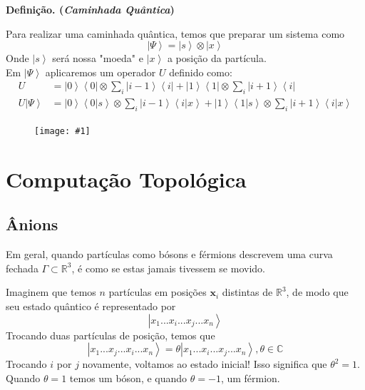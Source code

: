 \documentclass[t]{beamer}
\newcommand{\definicao}[1]{%
	\textbf{Definição. (\emph{#1})\\}
}
\newcommand{\ket}[1]{\ensuremath{\left|#1\right\rangle}}
\newcommand{\braket}[2]{\ensuremath{\left\langle#1|#2\right\rangle}}
\newcommand{\ketbra}[2]{\ensuremath{\left|#1\right\rangle\left\langle#2\right|}}
\newcommand{\imgw}[2]{%
\begin{center}
	\begin{figure}
	\texttt{[image: \#1]}\\
	\end{figure}
\end{center}
}
\begin{document}
	\begin{frame}{\subsecname}
	\definicao{Caminhada Quântica}
	Para realizar uma caminhada quântica, temos que preparar um sistema como
		$$\ket{\Psi} = \ket{s} \otimes \ket{x}$$
	Onde $\ket{s}$ será nossa "moeda" e $\ket{x}$ a posição da partícula.\\
	
	Em $\ket{\Psi}$ aplicaremos um operador $U$ definido como:
	\footnotesize	
	\begin{align*}
		U &= \ketbra{0}{0} \otimes \sum_{i}\ketbra{i-1}{i} + \ketbra{1}{1} \otimes \sum_{i}\ketbra{i+1}{i}\\
		U \ket{\Psi} &= \ket{0}\braket{0}{s} \otimes \sum_{i}\ket{i-1}\braket{i}{x} + \ket{1}\braket{1}{s} \otimes \sum_{i}\ket{i+1}\braket{i}{x}
	\end{align*}
	\normalsize
	
	\end{frame}
	
	\begin{frame}{\subsecname}
	
	\imgw{walk.pdf}{\textwidth}
	
	\end{frame}
	
	\section{Computação Topológica}
	
	\subsection{Ânions}
	
	\begin{frame}{\subsecname}
	Em geral, quando partículas como bósons e férmions descrevem uma curva fechada $\Gamma \subset \mathbb{R}^3$, é como se estas jamais tivessem se movido.
	\begin{center}
	\end{center}
	\end{frame}	
	
	\begin{frame}{\subsecname}
		Imaginem que temos $n$ partículas em posições $\mathbf{x}_i$ distintas de $\mathbb{R}^3$, de modo que seu estado quântico é representado por
		$$\ket{x_1 ... x_i ... x_j ... x_n}$$		
		Trocando duas partículas de posição, temos que
		$$\ket{x_1 ... x_j ... x_i ... x_n} = \theta \ket{x_1 ... x_i ... x_j ... x_n}, \theta \in \mathbb{C}$$
		Trocando $i$ por $j$ novamente, voltamos ao estado inicial! Isso significa que $\theta^2 = 1$. Quando $\theta = 1$ temos um bóson, e quando $\theta = -1$, um férmion.
	\end{frame}
	
\end{document}
